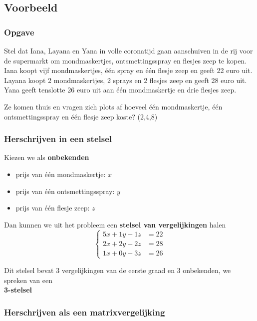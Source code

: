 \documentclass[12pt,twoside]{article}
\begin{document}
\subsection{Voorbeeld}

\subsubsection*{Opgave}

Stel dat Iana, Layana en Yana in volle coronatijd gaan aanschuiven in de rij voor de supermarkt om mondmaskertjes, ontsmettingsspray en flesjes zeep te kopen. Iana koopt vijf mondmaskertjes, één spray en één flesje zeep en geeft 22 euro uit. Layana koopt 2 mondmaskertjes, 2 sprays en 2 flesjes zeep en geeft 28 euro uit. Yana geeft tenslotte 26 euro uit aan één mondmaskertje en drie flesjes zeep.

Ze komen thuis en vragen zich plots af hoeveel één mondmaskertje, één ontsmettingsspray en één flesje zeep koste? (2,4,8)

\subsubsection*{Herschrijven in een stelsel}

Kiezen we als {\bf onbekenden}
\begin{itemize}
\item prijs van één mondmaskertje: $x$
\item prijs van één ontsmettingsspray: $y$
\item prijs van één flesje zeep: $z$
\end{itemize}

Dan kunnen we uit het probleem een {\bf stelsel van vergelijkingen} halen
$$\left\{
\begin{aligned}
  5x + 1y + 1z &= 22\\
  2x + 2y + 2z &= 28\\
  1x + 0y + 3z &= 26
\end{aligned}\right.$$

Dit stelsel bevat 3 vergelijkingen van de eerste graad en 3 onbekenden, we spreken van een\\
{\bf 3-stelsel}

\subsubsection*{Herschrijven als een matrixvergelijking}
\end{document}
